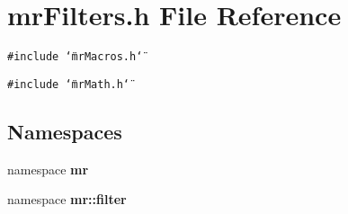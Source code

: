 \section{mr\-Filters.h File Reference}
\label{mrFilters_8h}
{\tt \#include \char`\"{}mr\-Macros.h\char`\"{}}\par
{\tt \#include \char`\"{}mr\-Math.h\char`\"{}}\par
\subsection*{Namespaces}
\begin{CompactItemize}
\item 
namespace {\bf mr}
\item 
namespace {\bf mr::filter}
\end{CompactItemize}
